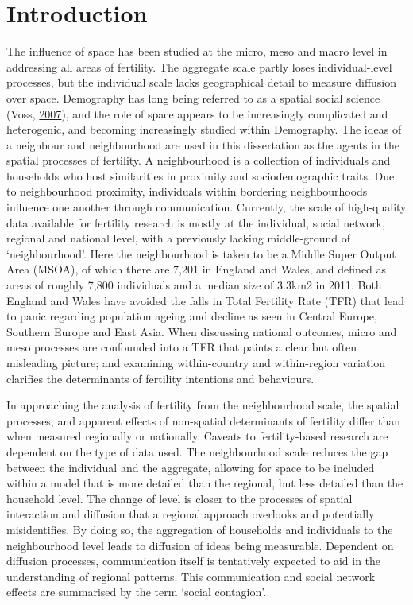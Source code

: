 \documentclass[12pt,twoside]{reedthesis}
\begin{document}
\mainmatter %
\pagestyle{fancyplain} %

\hypertarget{introduction}{%
\chapter*{Introduction}\label{introduction}}

The influence of space has been studied at the micro, meso and macro level in addressing all areas of fertility. The aggregate scale partly loses individual-level processes, but the individual scale lacks geographical detail to measure diffusion over space. Demography has long being referred to as a spatial social science (Voss, \protect\hyperlink{ref-voss2007}{2007}), and the role of space appears to be increasingly complicated and heterogenic, and becoming increasingly studied within Demography. The ideas of a neighbour and neighbourhood are used in this dissertation as the agents in the spatial processes of fertility. A neighbourhood is a collection of individuals and households who host similarities in proximity and sociodemographic traits. Due to neighbourhood proximity, individuals within bordering neighbourhoods influence one another through communication. Currently, the scale of high-quality data available for fertility research is mostly at the individual, social network, regional and national level, with a previously lacking middle-ground of `neighbourhood'. Here the neighbourhood is taken to be a Middle Super Output Area (MSOA), of which there are 7,201 in England and Wales, and defined as areas of roughly 7,800 individuals and a median size of 3.3km2 in 2011. Both England and Wales have avoided the falls in Total Fertility Rate (TFR) that lead to panic regarding population ageing and decline as seen in Central Europe, Southern Europe and East Asia. When discussing national outcomes, micro and meso processes are confounded into a TFR that paints a clear but often misleading picture; and examining within-country and within-region variation clarifies the determinants of fertility intentions and behaviours.

In approaching the analysis of fertility from the neighbourhood scale, the spatial processes, and apparent effects of non-spatial determinants of fertility differ than when measured regionally or nationally. Caveats to fertility-based research are dependent on the type of data used. The neighbourhood scale reduces the gap between the individual and the aggregate, allowing for space to be included within a model that is more detailed than the regional, but less detailed than the household level. The change of level is closer to the processes of spatial interaction and diffusion that a regional approach overlooks and potentially misidentifies. By doing so, the aggregation of households and individuals to the neighbourhood level leads to diffusion of ideas being measurable. Dependent on diffusion processes, communication itself is tentatively expected to aid in the understanding of regional patterns. This communication and social network effects are summarised by the term `social contagion'.
\end{document}
